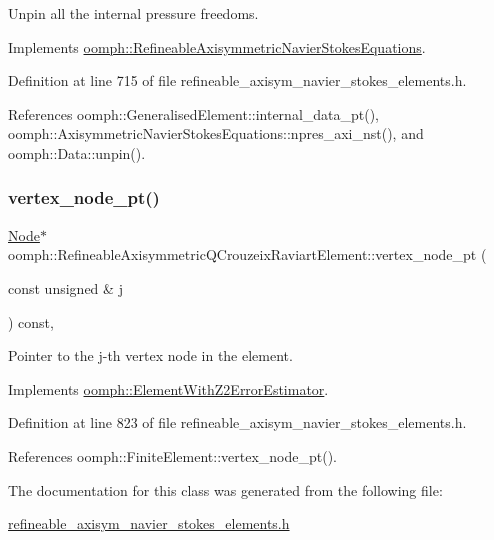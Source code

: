 Unpin all the internal pressure freedoms. 



Implements \hyperlink{classoomph_1_1RefineableAxisymmetricNavierStokesEquations_a01009bc617cad72b7467b5e947e7be88}{oomph\+::\+Refineable\+Axisymmetric\+Navier\+Stokes\+Equations}.



Definition at line 715 of file refineable\+\_\+axisym\+\_\+navier\+\_\+stokes\+\_\+elements.\+h.



References oomph\+::\+Generalised\+Element\+::internal\+\_\+data\+\_\+pt(), oomph\+::\+Axisymmetric\+Navier\+Stokes\+Equations\+::npres\+\_\+axi\+\_\+nst(), and oomph\+::\+Data\+::unpin().

\mbox{\label{classoomph_1_1RefineableAxisymmetricQCrouzeixRaviartElement_a9d6988c1e72c26c9279dad476eb5cdde}} 
\subsubsection{\texorpdfstring{vertex\+\_\+node\+\_\+pt()}{vertex\_node\_pt()}}
{\footnotesize\ttfamily \hyperlink{classoomph_1_1Node}{Node}$\ast$ oomph\+::\+Refineable\+Axisymmetric\+Q\+Crouzeix\+Raviart\+Element\+::vertex\+\_\+node\+\_\+pt (\begin{DoxyParamCaption}\item[{const unsigned \&}]{j }\end{DoxyParamCaption}) const\hspace{0.3cm}{\ttfamily [inline]}, {\ttfamily [virtual]}}



Pointer to the j-\/th vertex node in the element. 



Implements \hyperlink{classoomph_1_1ElementWithZ2ErrorEstimator_a0eedccc33519f852c5dc2055ddf2774b}{oomph\+::\+Element\+With\+Z2\+Error\+Estimator}.



Definition at line 823 of file refineable\+\_\+axisym\+\_\+navier\+\_\+stokes\+\_\+elements.\+h.



References oomph\+::\+Finite\+Element\+::vertex\+\_\+node\+\_\+pt().



The documentation for this class was generated from the following file\+:\begin{DoxyCompactItemize}
\item 
\hyperlink{refineable__axisym__navier__stokes__elements_8h}{refineable\+\_\+axisym\+\_\+navier\+\_\+stokes\+\_\+elements.\+h}\end{DoxyCompactItemize}

